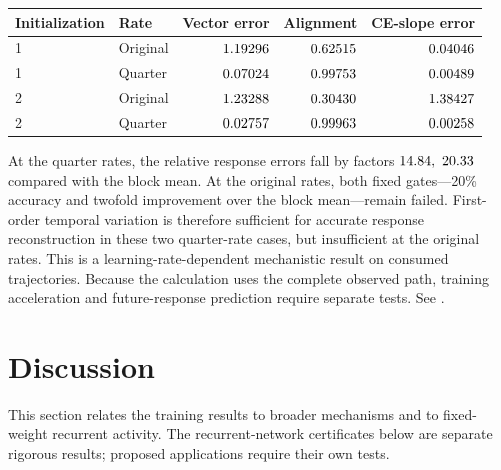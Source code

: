 \documentclass[11pt,letterpaper]{article}
\begin{document}
\par\medskip\noindent\begin{minipage}{\linewidth}
\captionsetup{hypcap=false}
\centering\small
\begin{tabular}{@{}llrrr@{}}
\toprule
Initialization & Rate & Vector error & Alignment & CE-slope error \\
\midrule
1 & Original & $1.19296$ & $0.62515$ & $0.04046$ \\
1 & Quarter & $0.07024$ & $0.99753$ & $0.00489$ \\
2 & Original & $1.23288$ & $0.30430$ & $1.38427$ \\
2 & Quarter & $0.02757$ & $0.99963$ & $0.00258$ \\
\bottomrule
\end{tabular}
\label{tab:lmfirstorder}
\end{minipage}\par\medskip

At the quarter rates, the relative response errors fall by factors
$14.84,\ 20.33$ compared with the block mean. At the original
rates, both fixed gates---20\% accuracy and twofold improvement over the block
mean---remain failed. First-order temporal variation is therefore sufficient
for accurate response reconstruction in these two quarter-rate cases, but
insufficient at the original rates. This is a learning-rate-dependent
mechanistic result on consumed trajectories. Because the calculation uses
the complete observed path, training acceleration and future-response
prediction require separate tests.
See .

\section{Discussion}
\label{sec:discussion}

This section relates the training results to broader mechanisms and to
fixed-weight recurrent activity. The recurrent-network certificates below
are separate rigorous results; proposed applications require their own tests.
\end{document}
